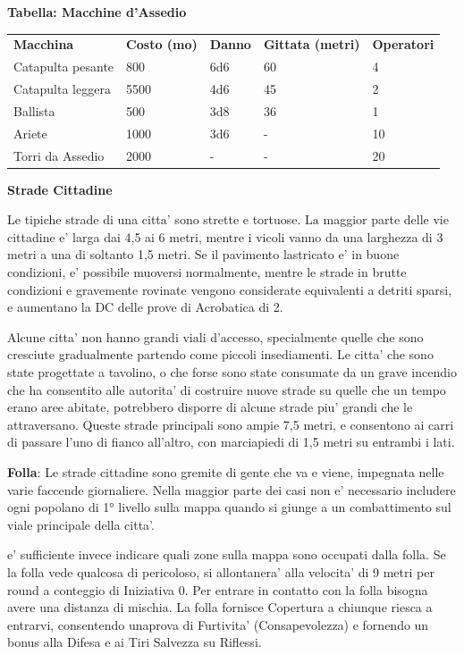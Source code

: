 \documentclass[a4paper,11pt,twoside,openany]{book}
\begin{document}
{		\bigskip
		
		\textbf{Tabella: Macchine d'Assedio}
		
		\medskip
		
		\begin{tabular}{lllll}
			\toprule
			\textbf{Macchina} & \textbf{Costo (mo)} & \textbf{Danno} & \textbf{Gittata (metri)} & \textbf{Operatori}\tabularnewline
			Catapulta pesante & 800 & 6d6 & 60 & 4\tabularnewline
			Catapulta leggera & 5500 & 4d6 & 45 & 2\tabularnewline
			Ballista & 500 & 3d8 & 36 & 1\tabularnewline
			Ariete & 1000 & 3d6 & - & 10\tabularnewline
			Torri da Assedio & 2000 & - & - & 20\tabularnewline
		\end{tabular}
		
		\bigskip
		
		\textbf{Strade Cittadine}
		
		Le tipiche strade di una citta' sono strette e tortuose. La maggior parte delle vie cittadine e' larga dai 4,5 ai 6 metri, mentre i vicoli vanno da una larghezza di 3 metri a una di soltanto 1,5 metri. Se il pavimento lastricato e' in buone condizioni, e' possibile muoversi normalmente, mentre le strade in brutte condizioni e gravemente rovinate vengono considerate equivalenti a detriti sparsi, e aumentano la DC delle prove di Acrobatica di 2.
		
		Alcune citta' non hanno grandi viali d'accesso, specialmente quelle che sono cresciute gradualmente partendo come piccoli insediamenti. Le citta' che sono state progettate a tavolino, o che forse sono state consumate da un grave incendio che ha consentito alle autorita' di costruire nuove strade su quelle che un tempo erano aree abitate, potrebbero disporre di alcune strade piu' grandi che le attraversano. Queste strade principali sono ampie 7,5 metri, e consentono ai carri di passare l'uno di fianco all'altro, con marciapiedi di 1,5 metri su entrambi i lati.
		
		\textbf{Folla}: Le strade cittadine sono gremite di gente che va e viene, impegnata nelle varie faccende giornaliere. Nella maggior parte dei casi non e' necessario includere ogni popolano di 1° livello sulla mappa quando si giunge a un combattimento sul viale principale della citta'.
		
		e' sufficiente invece indicare quali zone sulla mappa sono occupati dalla folla. Se la folla vede qualcosa di pericoloso, si allontanera' alla velocita' di 9 metri per round a conteggio di Iniziativa 0. Per entrare in contatto con la folla bisogna avere una distanza di mischia. La folla fornisce Copertura a chiunque riesca a entrarvi, consentendo unaprova di Furtivita' (Consapevolezza) e fornendo un bonus alla Difesa e ai Tiri Salvezza su Riflessi.
		
}
\end{document}
